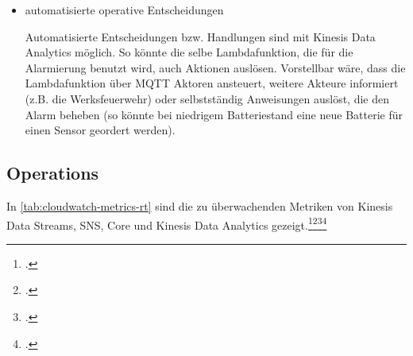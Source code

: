 \begin{itemize}
\item automatisierte operative Entscheidungen

Automatisierte Entscheidungen bzw. Handlungen sind mit Kinesis Data Analytics möglich. So könnte die selbe Lambdafunktion, die für die Alarmierung benutzt wird, auch Aktionen auslösen. Vorstellbar wäre, dass die Lambdafunktion über \ac{MQTT} Aktoren ansteuert, weitere Akteure informiert (z.B. die Werksfeuerwehr) oder selbstständig Anweisungen auslöst, die den Alarm beheben (so könnte bei niedrigem Batteriestand eine neue Batterie für einen Sensor geordert werden). 
\end{itemize}


\subsection{Operations} \label{chap:echtzeit_ops}
In \autoref{tab:cloudwatch-metrics-rt} sind die zu überwachenden Metriken von Kinesis Data Streams, \ac{SNS}, \AWSIOT{} Core und Kinesis Data Analytics gezeigt.\footcite[Vgl.][]{AmazonWebServicesInc..o.J.bb}\nzitat\footcite[Vgl.][]{AmazonWebServicesInc..o.J.bc}\nzitat\footcite[Vgl.][]{AmazonWebServicesInc..o.J.az}\nzitat\footcite[Vgl.][]{AmazonWebServicesInc..o.J.ay}

